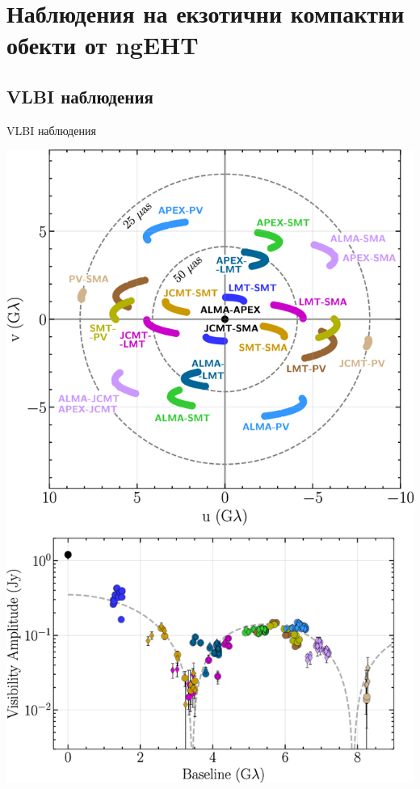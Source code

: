\documentclass[hyperref={colorlinks,citecolor=blue,linkcolor=blue,urlcolor=blue}]{beamer}
\begin{document}
	
	\section{Наблюдения на екзотични компактни обекти от ngEHT}
	
	\subsection{VLBI наблюдения}
	
	\begin{frame}{VLBI наблюдения}

		\centering
		\qquad
		\begin{minipage}{11em}
			\includegraphics[scale = 0.5]{Pre-Defence/UV_coverage.jpg}

\end{minipage}
\end{frame}
\end{document}
